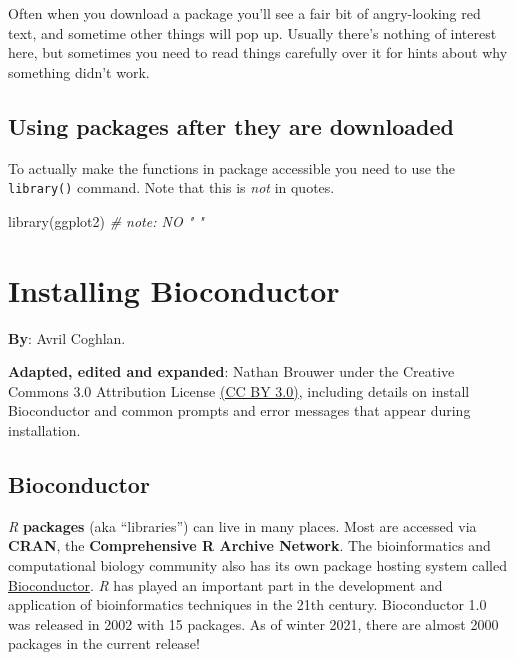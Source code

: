 \documentclass[
]{book}
\newenvironment{Shaded}{\begin{snugshade}}{\end{snugshade}}
\newcommand{\CommentTok}[1]{\textcolor[rgb]{0.56,0.35,0.01}{\textit{#1}}}
\newcommand{\FunctionTok}[1]{\textcolor[rgb]{0.00,0.00,0.00}{#1}}
\newcommand{\NormalTok}[1]{#1}
\begin{document}
Often when you download a package you'll see a fair bit of angry-looking red text, and sometime other things will pop up. Usually there's nothing of interest here, but sometimes you need to read things carefully over it for hints about why something didn't work.

\hypertarget{using-packages-after-they-are-downloaded}{%
\section{Using packages after they are downloaded}\label{using-packages-after-they-are-downloaded}}

To actually make the functions in package accessible you need to use the \texttt{library()} command. Note that this is \emph{not} in quotes.

\begin{Shaded}
\begin{Highlighting}[]
\FunctionTok{library}\NormalTok{(ggplot2) }\CommentTok{\# note: NO " "}
\end{Highlighting}
\end{Shaded}

\hypertarget{installing-bioconductor}{%
\chapter{Installing Bioconductor}\label{installing-bioconductor}}

\textbf{By}: Avril Coghlan.

\textbf{Adapted, edited and expanded}: Nathan Brouwer under the Creative Commons 3.0 Attribution License \href{https://creativecommons.org/licenses/by/3.0/}{(CC BY 3.0)}, including details on install Bioconductor and common prompts and error messages that appear during installation.

\hypertarget{bioconductor}{%
\section{Bioconductor}\label{bioconductor}}

\emph{R} \textbf{packages} (aka ``libraries'') can live in many places. Most are accessed via \textbf{CRAN}, the \textbf{Comprehensive R Archive Network}. The bioinformatics and computational biology community also has its own package hosting system called \href{www.bioconductor.org}{Bioconductor}. \emph{R} has played an important part in the development and application of bioinformatics techniques in the 21th century. Bioconductor 1.0 was released in 2002 with 15 packages. As of winter 2021, there are almost 2000 packages in the current release!
\end{document}
